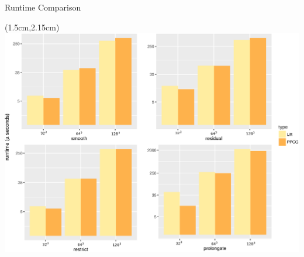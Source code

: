 \documentclass{beamer}
\begin{document}
\begin{frame}{Runtime Comparison}
{		\begin{textblock*}{10cm}(1.5cm,2.15cm)
			\includegraphics[scale=0.375]{img/plots/runtime_4_edited.eps}
		\end{textblock*}
	}
\end{frame}
\end{document}
